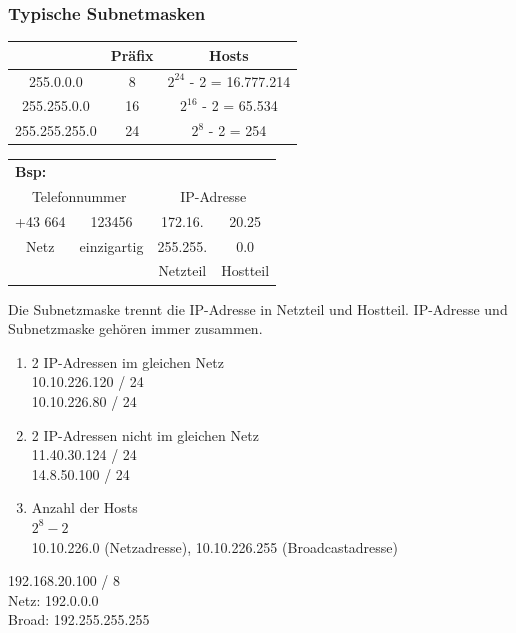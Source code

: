 \subsubsection*{Typische Subnetmasken}
\begin{table}[H]
	\begin{tabular}{c|c|c}
		& Präfix & Hosts \\
		\hline
		255.0.0.0 & 8 & $2^{24}$ - 2 = 16.777.214 \\
		\hline
		255.255.0.0 & 16 & $2^{16}$ - 2 = 65.534 \\
		\hline
		255.255.255.0 & 24 & $2^{8}$ - 2 = 254
	\end{tabular}
\end{table}
\begin{table}[H]
	\begin{tabular}{cc|cc}
		\multicolumn{4}{l}{\textbf{Bsp:}} \\
		\multicolumn{2}{c}{Telefonnummer} & \multicolumn{2}{c}{IP-Adresse} \\
		+43 664 & 123456 & 172.16. & 20.25 \\
		Netz & einzigartig & 255.255. & 0.0 \\
		 & & Netzteil & Hostteil
	\end{tabular}
\end{table}
Die Subnetzmaske trennt die IP-Adresse in Netzteil und Hostteil. IP-Adresse und Subnetzmaske gehören immer zusammen.

\begin{enumerate}
	\item 2 IP-Adressen im gleichen Netz \\
	10.10.226.120 / 24 \\
	10.10.226.80 / 24 \\
	\item 2 IP-Adressen nicht im gleichen Netz \\
	11.40.30.124 / 24 \\
	14.8.50.100 / 24 \\
	\item Anzahl der Hosts \\
	$2^{8} - 2$ \\
	10.10.226.0 (Netzadresse), 10.10.226.255 (Broadcastadresse)
\end{enumerate}

192.168.20.100 / 8 \\
Netz:  192.0.0.0 \\
Broad: 192.255.255.255

